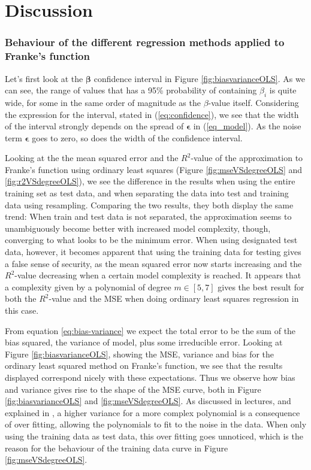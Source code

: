 \section{Discussion}
\label{sec:discussion}

\subsubsection*{Behaviour of the different regression methods applied to Franke's function}
Let's first look at the $\boldsymbol{\beta}$ confidence interval in Figure \ref{fig:biasvarianceOLS}. As we can see, the range of values that has a 95\% probability of containing $\beta_i$ is quite wide, for some in the same order of magnitude as the $\beta$-value itself. Considering the expression for the interval, stated in (\ref{eq:confidence}), we see that the width of the interval strongly depends on the spread of $\boldsymbol{\epsilon}$ in (\ref{eq_model}). As the noise term $\boldsymbol{\epsilon}$ goes to zero, so does the width of the confidence interval.

Looking at the  the mean squared error and the $R^2$-value of the approximation to Franke's function using ordinary least squares (Figure \ref{fig:mseVSdegreeOLS} and \ref{fig:r2VSdegreeOLS}), we see the difference in the results when using the entire training set as test data, and when separating the data into test and training data using resampling. Comparing the two results, they both display the same trend: When train and test data is not separated, the approximation seems to unambiguously become better with increased model complexity, though, converging to what looks to be the minimum error. When using designated test data, however, it becomes apparent that using the training data for testing gives a false sense of security, as the mean squared error now starts increasing and the $R^2$-value decreasing when a certain model complexity is reached. It appears that a complexity given by a polynomial of degree $m \in [5,7]$ gives the best result for both the $R^2$-value and the MSE when doing ordinary least squares regression in this case.

From equation \eqref{eq:bias-variance} we expect the total error to be the sum of the bias squared, the variance of model, plus some irreducible error. Looking at Figure \ref{fig:biasvarianceOLS}, showing the MSE, variance and bias for the ordinary least squared method on Franke's function, we see that the results displayed correspond nicely with these expectations. Thus we observe how bias and variance gives rise to the shape of the MSE curve, both in Figure \ref{fig:biasvarianceOLS} and \ref{fig:mseVSdegreeOLS}. As discussed in lectures, and explained in \cite{hastie2009elements}, a higher variance for a more complex polynomial is a consequence of over fitting, allowing the polynomials to fit to the noise in the data. When only using the training data as test data, this over fitting goes unnoticed, which is the reason for the behaviour of the training data curve in Figure \ref{fig:mseVSdegreeOLS}.

